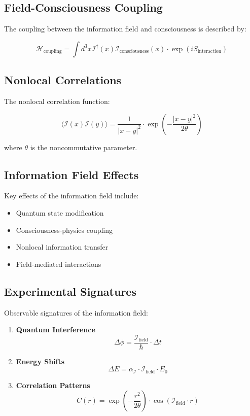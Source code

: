 \subsection{Field-Consciousness Coupling}

The coupling between the information field and consciousness is described by:

\[
\mathcal{H}_{\text{coupling}} = \int d^3x \mathcal{I}^{\dagger}(x) \mathcal{I}_{\text{consciousness}}(x) \cdot \exp(iS_{\text{interaction}})
\]

\subsection{Nonlocal Correlations}

The nonlocal correlation function:

\[
\langle \mathcal{I}(x)\mathcal{I}(y) \rangle = \frac{1}{|x-y|^2} \cdot \exp\left(-\frac{|x-y|^2}{2\theta}\right)
\]

where \(\theta\) is the noncommutative parameter.

\subsection{Information Field Effects}

Key effects of the information field include:

\begin{itemize}
    \item Quantum state modification
    \item Consciousness-physics coupling
    \item Nonlocal information transfer
    \item Field-mediated interactions
\end{itemize}

\subsection{Experimental Signatures}

Observable signatures of the information field:

\begin{enumerate}
    \item \textbf{Quantum Interference}
    \[
    \Delta \phi = \frac{\mathcal{I}_{\text{field}}}{\hbar} \cdot \Delta t
    \]
    
    \item \textbf{Energy Shifts}
    \[
    \Delta E = \alpha_{\mathcal{I}} \cdot \mathcal{I}_{\text{field}} \cdot E_0
    \]
    
    \item \textbf{Correlation Patterns}
    \[
    C(r) = \exp\left(-\frac{r^2}{2\theta}\right) \cdot \cos(\mathcal{I}_{\text{field}} \cdot r)
    \]
\end{enumerate}

